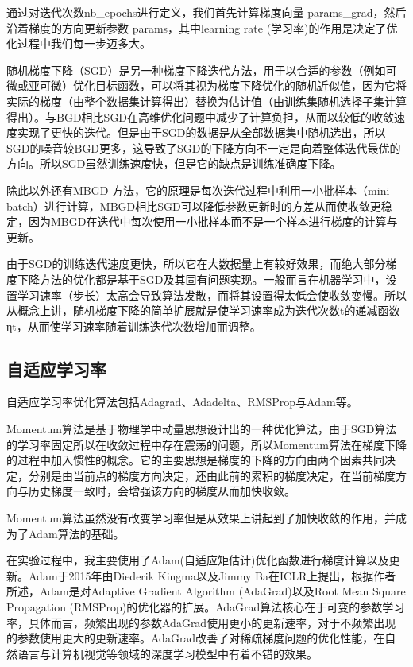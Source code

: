 通过对迭代次数nb\_epochs进行定义，我们首先计算梯度向量 params\_grad，然后沿着梯度的方向更新参数 params，其中learning rate (学习率)的作用是决定了优化过程中我们每一步迈多大。

随机梯度下降（SGD）是另一种梯度下降迭代方法，用于以合适的参数（例如可微或亚可微）优化目标函数，可以将其视为梯度下降优化的随机近似值，因为它将实际的梯度（由整个数据集计算得出）替换为估计值（由训练集随机选择子集计算得出）。与BGD相比SGD在高维优化问题中减少了计算负担，从而以较低的收敛速度实现了更快的迭代。但是由于SGD的数据是从全部数据集中随机选出，所以SGD的噪音较BGD更多，这导致了SGD的下降方向不一定是向着整体迭代最优的方向。所以SGD虽然训练速度快，但是它的缺点是训练准确度下降。

除此以外还有MBGD 方法，它的原理是每次迭代过程中利用一小批样本（mini-batch）进行计算，MBGD相比SGD可以降低参数更新时的方差从而使收敛更稳定，因为MBGD在迭代中每次使用一小批样本而不是一个样本进行梯度的计算与更新。

由于SGD的训练迭代速度更快，所以它在大数据量上有较好效果，而绝大部分梯度下降方法的优化都是基于SGD及其固有问题实现。一般而言在机器学习中，设置学习速率（步长）太高会导致算法发散，而将其设置得太低会使收敛变慢。所以从概念上讲，随机梯度下降的简单扩展就是使学习速率成为迭代次数t的递减函数ηt，从而使学习速率随着训练迭代次数增加而调整。

\subsection{自适应学习率}

自适应学习率优化算法包括Adagrad、Adadelta、RMSProp与Adam等。

Momentum算法是基于物理学中动量思想设计出的一种优化算法，由于SGD算法的学习率固定所以在收敛过程中存在震荡的问题，所以Momentum算法在梯度下降的过程中加入惯性的概念。它的主要思想是梯度的下降的方向由两个因素共同决定，分别是由当前点的梯度方向决定，还由此前的累积的梯度决定，在当前梯度方向与历史梯度一致时，会增强该方向的梯度从而加快收敛。

Momentum算法虽然没有改变学习率但是从效果上讲起到了加快收敛的作用，并成为了Adam算法的基础。

在实验过程中，我主要使用了Adam(自适应矩估计)优化函数进行梯度计算以及更新。Adam\cite{kingma2014adam}于2015年由Diederik Kingma以及Jimmy Ba在ICLR上提出，根据作者所述，Adam是对Adaptive Gradient Algorithm (AdaGrad)以及Root Mean Square Propagation (RMSProp)的优化器的扩展。AdaGrad算法核心在于可变的参数学习率，具体而言，频繁出现的参数AdaGrad使用更小的更新速率，对于不频繁出现的参数使用更大的更新速率。AdaGrad改善了对稀疏梯度问题的优化性能，在自然语言与计算机视觉等领域的深度学习模型中有着不错的效果。

